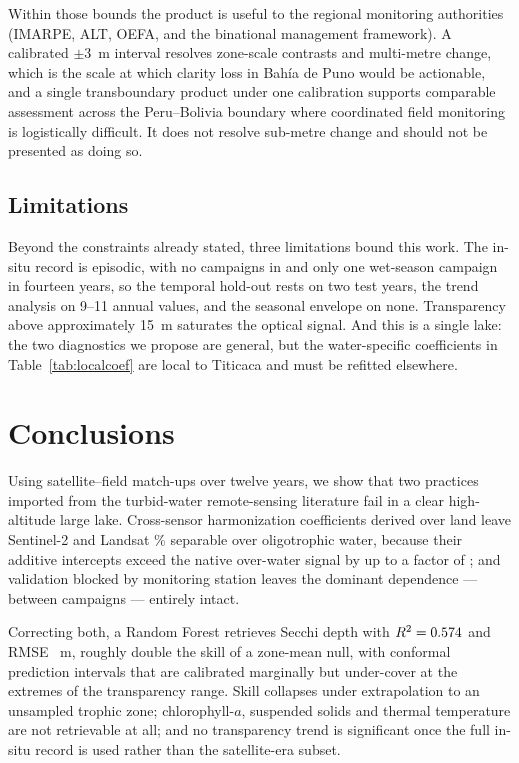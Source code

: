 \documentclass[final,5p,times,twocolumn,authoryear]{elsarticle}
\begin{document}
Within those bounds the product is useful to the regional monitoring
authorities (IMARPE, ALT, OEFA, and the binational management framework). A
calibrated $\pm3$~m interval resolves zone-scale contrasts and multi-metre
change, which is the scale at which clarity loss in Bah\'ia de Puno would be
actionable, and a single transboundary product under one calibration supports
comparable assessment across the Peru--Bolivia boundary where coordinated
field monitoring is logistically difficult. It does not resolve sub-metre
change and should not be presented as doing so.

\subsection{Limitations}

Beyond the constraints already stated, three limitations bound this work. The
in-situ record is episodic, with no campaigns in \numYearsMissing{} and only
one wet-season campaign in fourteen years, so the temporal hold-out rests on
two test years, the trend analysis on 9--11 annual values, and the seasonal
envelope on none. Transparency above approximately
15~m saturates the optical signal. And this is a single lake: the two
diagnostics we propose are general, but the water-specific coefficients in
Table~\ref{tab:localcoef} are local to Titicaca and must be refitted
elsewhere.

\section{Conclusions}\label{sec:conclusions}

Using \numMatchupsTotal{} satellite--field match-ups over twelve years, we
show that two practices imported from the turbid-water remote-sensing
literature fail in a clear high-altitude large lake. Cross-sensor
harmonization coefficients derived over land leave Sentinel-2 and Landsat
\numSensorAccAll\% separable over oligotrophic water, because their additive
intercepts exceed the native over-water signal by up to a factor of
\numRoyRatioNir; and validation blocked by monitoring station leaves the
dominant dependence --- between campaigns --- entirely intact.

Correcting both, a Random Forest retrieves Secchi depth with
$R^2=0.574$ and RMSE \numHeadlineRmse~m, roughly double the skill
of a zone-mean null, with conformal prediction intervals that are calibrated
marginally but under-cover at the extremes of the transparency range. Skill
collapses under extrapolation to an unsampled trophic zone;
chlorophyll-$a$, suspended solids and thermal temperature are not retrievable
at all; and no transparency trend is significant once the full in-situ record
is used rather than the satellite-era subset.
\end{document}
